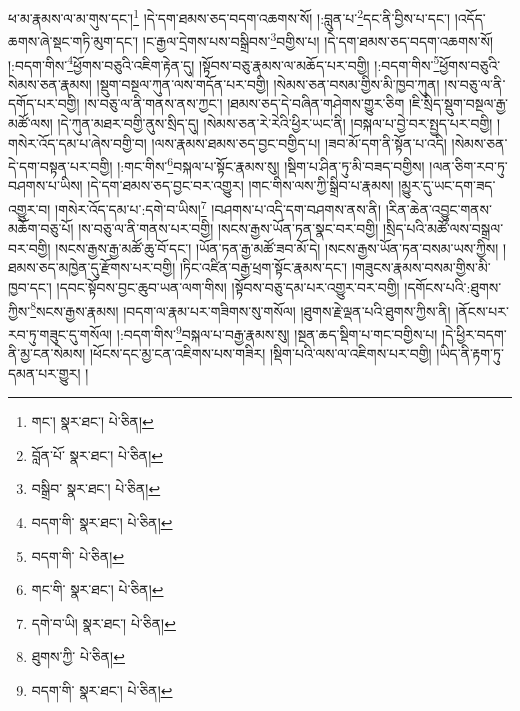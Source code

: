 ཕ་མ་རྣམས་ལ་མ་གུས་དང་།\footnote{གང་།  སྣར་ཐང་།  པེ་ཅིན། } །དེ་དག་ཐམས་ཅད་བདག་འཆགས་སོ། །:བླུན་པ་\footnote{བློན་པོ་  སྣར་ཐང་།  པེ་ཅིན། }དང་ནི་བྱིས་པ་དང་། །འདོད་ཆགས་ཞེ་སྡང་གཏི་མུག་དང་། །ང་རྒྱལ་དྲེགས་པས་བསྒྲིབས་\footnote{བསྒྲིབ་  སྣར་ཐང་།  པེ་ཅིན། }བགྱིས་པ། །དེ་དག་ཐམས་ཅད་བདག་འཆགས་སོ། །:བདག་གིས་\footnote{བདག་གི་  སྣར་ཐང་།  པེ་ཅིན། }ཕྱོགས་བཅུའི་འཇིག་རྟེན་དུ། །སྟོབས་བཅུ་རྣམས་ལ་མཆོད་པར་བགྱི། །:བདག་གིས་\footnote{བདག་གི་  པེ་ཅིན། }ཕྱོགས་བཅུའི་སེམས་ཅན་རྣམས། །སྡུག་བསྔལ་ཀུན་ལས་གདོན་པར་བགྱི། །སེམས་ཅན་བསམ་གྱིས་མི་ཁྱབ་ཀུན། །ས་བཅུ་ལ་ནི་དགོད་པར་བགྱི། །ས་བཅུ་ལ་ནི་གནས་ནས་ཀྱང་། །ཐམས་ཅད་དེ་བཞིན་གཤེགས་གྱུར་ཅིག །ཇི་སྲིད་སྡུག་བསྔལ་རྒྱ་མཚོ་ལས། །དེ་ཀུན་མཐར་བགྱི་ནུས་སྲིད་དུ། །སེམས་ཅན་རེ་རེའི་ཕྱིར་ཡང་ནི། །བསྐལ་པ་བྱེ་བར་སྤྱད་པར་བགྱི། །གསེར་འོད་དམ་པ་ཞེས་བགྱི་བ། །ལས་རྣམས་ཐམས་ཅད་བྱང་བགྱིད་པ། །ཟབ་མོ་དག་ནི་སྟོན་པ་འདི། །སེམས་ཅན་དེ་དག་བསྟན་པར་བགྱི། །:གང་གིས་\footnote{གང་གི་  སྣར་ཐང་།  པེ་ཅིན། }བསྐལ་པ་སྟོང་རྣམས་སུ། །སྡིག་པ་ཤིན་ཏུ་མི་བཟད་བགྱིས། །ལན་ཅིག་རབ་ཏུ་བཤགས་པ་ཡིས། །དེ་དག་ཐམས་ཅད་བྱང་བར་འགྱུར། །གང་གིས་ལས་ཀྱི་སྒྲིབ་པ་རྣམས། །མྱུར་དུ་ཡང་དག་ཟད་འགྱུར་བ། །གསེར་འོད་དམ་པ་:དགེ་བ་ཡིས།\footnote{དགེ་བ་ཡི།  སྣར་ཐང་།  པེ་ཅིན། } །བཤགས་པ་འདི་དག་བཤགས་ནས་ནི། །རིན་ཆེན་འབྱུང་གནས་མཆོག་བཅུ་པོ། །ས་བཅུ་ལ་ནི་གནས་པར་བགྱི། །སངས་རྒྱས་ཡོན་ཏན་སྣང་བར་བགྱི། །སྲིད་པའི་མཚོ་ལས་བསྒྲལ་བར་བགྱི། །སངས་རྒྱས་རྒྱ་མཚོ་ཆུ་བོ་དང་། །ཡོན་ཏན་རྒྱ་མཚོ་ཟབ་མོ་དེ། །སངས་རྒྱས་ཡོན་ཏན་བསམ་ཡས་ཀྱིས། །ཐམས་ཅད་མཁྱེན་དུ་རྫོགས་པར་བགྱི། །ཏིང་འཛིན་བརྒྱ་ཕྲག་སྟོང་རྣམས་དང་། །གཟུངས་རྣམས་བསམ་གྱིས་མི་ཁྱབ་དང་། །དབང་སྟོབས་བྱང་ཆུབ་ཡན་ལག་གིས། །སྟོབས་བཅུ་དམ་པར་འགྱུར་བར་བགྱི། །དགོངས་པའི་:ཐུགས་ཀྱིས་\footnote{ཐུགས་ཀྱི་  པེ་ཅིན། }སངས་རྒྱས་རྣམས། །བདག་ལ་རྣམ་པར་གཟིགས་སུ་གསོལ། །ཐུགས་རྗེ་ལྡན་པའི་ཐུགས་ཀྱིས་ནི། །ནོངས་པར་རབ་ཏུ་གཟུང་དུ་གསོལ། །:བདག་གིས་\footnote{བདག་གི་  སྣར་ཐང་།  པེ་ཅིན། }བསྐལ་པ་བརྒྱ་རྣམས་སུ། །སྔན་ཆད་སྡིག་པ་གང་བགྱིས་པ། །དེ་ཕྱིར་བདག་ནི་མྱ་ངན་སེམས། །ཕོངས་དང་མྱ་ངན་འཇིགས་པས་གཟིར། །སྡིག་པའི་ལས་ལ་འཇིགས་པར་བགྱི། །ཡིད་ནི་རྟག་ཏུ་དམན་པར་གྱུར། །
